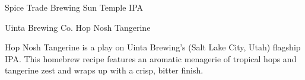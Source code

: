 \begin{recipie}{Spice Trade Brewing Sun Temple IPA}
\begin{ingredientsblock}
\begin{yeasts}
\end{yeasts}

\end{ingredientsblock}

\end{recipie}

\begin{recipie}{Uinta Brewing Co. Hop Nosh Tangerine}

\begin{aboutblock}
Hop Nosh Tangerine is a play on Uinta Brewing’s (Salt Lake City, Utah) flagship
IPA. This homebrew recipe features an aromatic menagerie of tropical hops and
tangerine zest and wraps up with a crisp, bitter finish.
\end{aboutblock}


\begin{methodandtiming}
 
\begin{mashsteps}
\end{mashsteps}

\begin{fermentationsteps}
\end{fermentationsteps}

\end{methodandtiming}

\pagebreak

\begin{ingredientsblock}

\begin{malts}
\end{malts}

\begin{hops}
\end{hops}

\begin{yeasts}
\end{yeasts}

\end{ingredientsblock}

\end{recipie}

